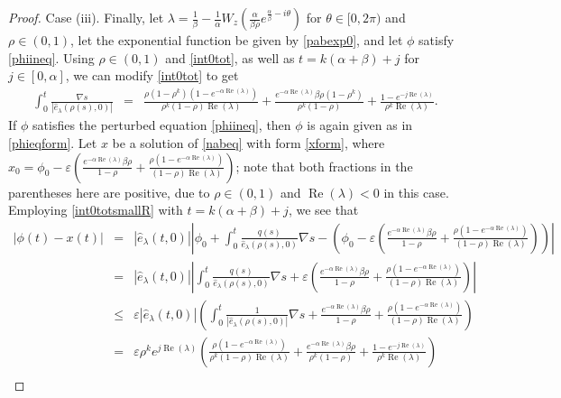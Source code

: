\documentclass[12pt,reqno]{amsart}
\theoremstyle{plain}
\theoremstyle{definition}
\numberwithin{equation}{section}
\numberwithin{theorem}{section}
\begin{document}
\begin{proof}
Case (iii).
Finally, let $\lambda = \frac{1}{\beta}-\frac{1}{\alpha}W_z\left(\frac{\alpha}{\beta \rho}e^{\frac{\alpha}{\beta}-i\theta}\right)$ for $\theta\in[0,2\pi)$ and $\rho\in(0,1)$, let the exponential function be given by \eqref{pabexp0}, and let $\phi$ satisfy \eqref{phiineq}. Using $\rho\in(0,1)$ and \eqref{int0tot}, as well as $t=k(\alpha+\beta)+j$ for $j\in[0,\alpha]$, we can modify \eqref{int0tot} to get
\begin{eqnarray}
 \int_{0}^{t} \frac{\nabla s}{|\widehat{e}_{\lambda}(\rho(s),0)|} 
  &=& \frac{\rho(1-\rho^k)(1-e^{-\alpha\operatorname{Re}(\lambda)})}{\rho^k(1-\rho)\operatorname{Re}(\lambda)} + \frac{e^{-\alpha\operatorname{Re}(\lambda)}\beta \rho(1-\rho^k)}{\rho^k(1-\rho)} + \frac{1-e^{-j\operatorname{Re}(\lambda)}}{\rho^k\operatorname{Re}(\lambda)} \label{int0totsmallR}. 
\end{eqnarray}
If $\phi$ satisfies the perturbed equation \eqref{phiineq}, then $\phi$ is again given as in \eqref{phieqform}.
Let $x$ be a solution of \eqref{nabeq} with form \eqref{xform}, where $x_0=\phi_0-\varepsilon\left(\frac{e^{-\alpha\operatorname{Re}(\lambda)}\beta \rho}{1-\rho}+\frac{\rho(1-e^{-\alpha\operatorname{Re}(\lambda)})}{(1-\rho)\operatorname{Re}(\lambda)}\right)$; note that both fractions in the parentheses here are positive, due to $\rho\in(0,1)$ and $\operatorname{Re}(\lambda)<0$ in this case. Employing \eqref{int0totsmallR} with $t=k(\alpha+\beta)+j$, we see that
\begin{eqnarray*}
 |\phi(t)-x(t)| &=& |\widehat{e}_{\lambda}(t,0)|\left|\phi_0+\int_0^t \frac{q(s)}{\widehat{e}_{\lambda}(\rho(s),0)}\nabla s-\left(\phi_0-\varepsilon\left(\frac{e^{-\alpha\operatorname{Re}(\lambda)}\beta \rho}{1-\rho}+\frac{\rho(1-e^{-\alpha\operatorname{Re}(\lambda)})}{(1-\rho)\operatorname{Re}(\lambda)}\right)\right)\right| \\
 &=& |\widehat{e}_{\lambda}(t,0)|\left|\int_0^t \frac{q(s)}{\widehat{e}_{\lambda}(\rho(s),0)}\nabla s+\varepsilon\left(\frac{e^{-\alpha\operatorname{Re}(\lambda)}\beta \rho}{1-\rho}+\frac{\rho(1-e^{-\alpha\operatorname{Re}(\lambda)})}{(1-\rho)\operatorname{Re}(\lambda)}\right)\right| \\
 &\le& \varepsilon |\widehat{e}_{\lambda}(t,0)|\left(\int_0^t \frac{1}{|\widehat{e}_{\lambda}(\rho(s),0)|}\nabla s + \frac{e^{-\alpha\operatorname{Re}(\lambda)}\beta \rho}{1-\rho}+\frac{\rho(1-e^{-\alpha\operatorname{Re}(\lambda)})}{(1-\rho)\operatorname{Re}(\lambda)}\right) \\
 &=& \varepsilon \rho^ke^{j\operatorname{Re}(\lambda)}\left(\frac{\rho(1-e^{-\alpha\operatorname{Re}(\lambda)})}{\rho^k(1-\rho)\operatorname{Re}(\lambda)} + \frac{e^{-\alpha\operatorname{Re}(\lambda)}\beta \rho}{\rho^k(1-\rho)} + \frac{1-e^{-j\operatorname{Re}(\lambda)}}{\rho^k\operatorname{Re}(\lambda)}\right) \\

\end{eqnarray*}
\end{proof}
\end{document}
